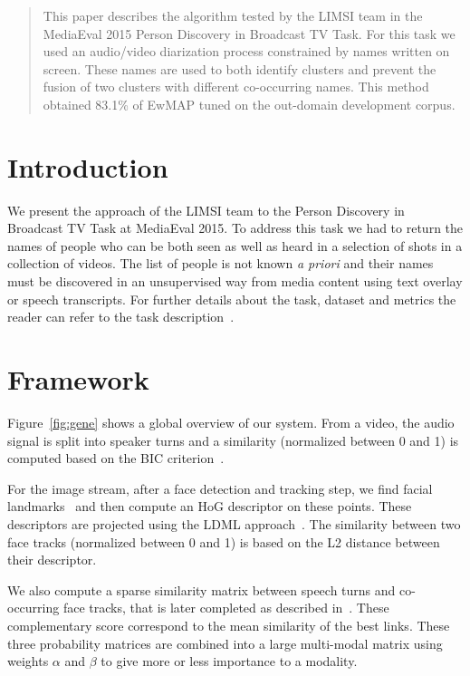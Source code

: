 \documentclass{acm_proc_article-me}
\begin{document}
\maketitle
\begin{abstract}

This paper describes the algorithm tested by the LIMSI team in the MediaEval 2015 Person Discovery in Broadcast TV Task. For this task we used an audio/video diarization process constrained by names written on screen. These names are used to both identify clusters and prevent the fusion of two clusters with different co-occurring names. This method obtained 83.1\% of EwMAP tuned on the out-domain development corpus.

\end{abstract}


\section{Introduction}

We present the approach of the LIMSI team to the Person Discovery in Broadcast TV Task at MediaEval 2015. To address this task we had to return the names of people who can be both seen as well as heard in a selection of shots in a collection of videos. The list of people is not known \emph{a priori} and their names must be discovered in an unsupervised way from media content using text overlay or speech transcripts. For further details about the task, dataset and metrics the reader can refer to the task description~\cite{POIGNANT--MEDIAEVAL--2015}.

\section{Framework}

Figure~\ref{fig:gene} shows a global overview of our system. From a video, the audio signal is split into speaker turns and a similarity (normalized between 0 and 1) is computed based on the BIC criterion~\cite{CHEN--DARPA--1998}. 

For the image stream, after a face detection and tracking step, we find facial landmarks~\cite{URICAR--VISAPP--2012} and then compute an HoG descriptor on these points. These descriptors are projected using the LDML approach~\cite{GUILLAUMIN--IJCV--2012}. The similarity between two face tracks (normalized between 0 and 1) is based on the L2 distance between their descriptor.

We also compute a sparse similarity matrix between speech turns and co-occurring face tracks, that is later completed as described in~\cite{POIGNANT--MTAP--2015}. These complementary score correspond to the mean similarity of the best links. These three probability matrices are combined into a large multi-modal matrix using weights $\alpha$ and $\beta$ to give more or less importance to a modality.
\end{document}
